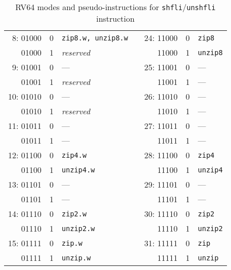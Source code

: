 \begin{table}[h]
\begin{small}
\begin{center}
\begin{tabular}{r c l p{1in} r c l}
\cline{1-3}
\cline{5-7}

 8: 01000 & 0 & {\tt zip8.w, unzip8.w}   &   &   24: 11000 & 0 & {\tt zip8}              \\
    01000 & 1 & {\it reserved}           &   &       11000 & 1 & {\tt unzip8}            \\
 9: 01001 & 0 & ---                      &   &   25: 11001 & 0 & ---                     \\
    01001 & 1 & {\it reserved}           &   &       11001 & 1 & ---                     \\
10: 01010 & 0 & ---                      &   &   26: 11010 & 0 & ---                     \\
    01010 & 1 & {\it reserved}           &   &       11010 & 1 & ---                     \\
11: 01011 & 0 & ---                      &   &   27: 11011 & 0 & ---                     \\
    01011 & 1 & ---                      &   &       11011 & 1 & ---                     \\

\cline{1-3}
\cline{5-7}

12: 01100 & 0 & {\tt zip4.w}             &   &   28: 11100 & 0 & {\tt zip4}              \\
    01100 & 1 & {\tt unzip4.w}           &   &       11100 & 1 & {\tt unzip4}            \\
13: 01101 & 0 & ---                      &   &   29: 11101 & 0 & ---                     \\
    01101 & 1 & ---                      &   &       11101 & 1 & ---                     \\
14: 01110 & 0 & {\tt zip2.w}             &   &   30: 11110 & 0 & {\tt zip2}              \\
    01110 & 1 & {\tt unzip2.w}           &   &       11110 & 1 & {\tt unzip2}            \\
15: 01111 & 0 & {\tt zip.w}              &   &   31: 11111 & 0 & {\tt zip}               \\
    01111 & 1 & {\tt unzip.w}            &   &       11111 & 1 & {\tt unzip}             \\

\end{tabular}
\end{center}
\end{small}
\caption{RV64 modes and pseudo-instructions for {\tt shfli}/{\tt unshfli} instruction}
\label{gzip64-modes}
\end{table}

